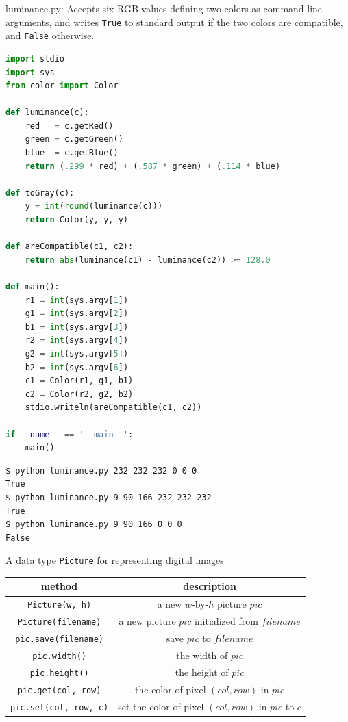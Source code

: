 \documentclass[8pt,a4paper,compress,handout]{beamer}
\begin{document}
\begin{frame}[fragile]
\begin{framed}
\tiny luminance.py: Accepts six RGB values defining two colors as command-line arguments, and writes \lstinline{True} to standard output if the two colors are compatible, and \lstinline{False} otherwise.
\end{framed}

\begin{lstlisting}[language=Python]
import stdio
import sys
from color import Color

def luminance(c):
    red   = c.getRed()
    green = c.getGreen()
    blue  = c.getBlue()
    return (.299 * red) + (.587 * green) + (.114 * blue)

def toGray(c):
    y = int(round(luminance(c)))
    return Color(y, y, y)

def areCompatible(c1, c2):
    return abs(luminance(c1) - luminance(c2)) >= 128.0

def main():
    r1 = int(sys.argv[1])
    g1 = int(sys.argv[2])
    b1 = int(sys.argv[3])
    r2 = int(sys.argv[4])
    g2 = int(sys.argv[5])
    b2 = int(sys.argv[6])
    c1 = Color(r1, g1, b1)
    c2 = Color(r2, g2, b2)
    stdio.writeln(areCompatible(c1, c2))

if __name__ == '__main__':
    main()
\end{lstlisting}
\end{frame}

\begin{frame}[fragile]
\begin{lstlisting}[language={}]
$ python luminance.py 232 232 232 0 0 0
True
$ python luminance.py 9 90 166 232 232 232
True
$ python luminance.py 9 90 166 0 0 0
False
\end{lstlisting}
\end{frame}

\begin{frame}[fragile]
A data type \lstinline{Picture} for representing digital images
\begin{center}
\begin{tabular}{cc}
method & description \\ \hline
\lstinline$Picture(w, h)$ & a new $w$-by-$h$ picture $pic$ \\
\lstinline$Picture(filename)$ & a new picture $pic$ initialized from $filename$ \\
\lstinline$pic.save(filename)$ & save $pic$ to $filename$ \\
\lstinline$pic.width()$ & the width of $pic$ \\
\lstinline$pic.height()$ & the height of $pic$ \\
\lstinline$pic.get(col, row)$ & the color of pixel $(col, row)$ in $pic$ \\
\lstinline$pic.set(col, row, c)$ & set the color of pixel $(col, row)$ in $pic$ to $c$
\end{tabular} 
\end{center}
\end{frame}
\end{document}
